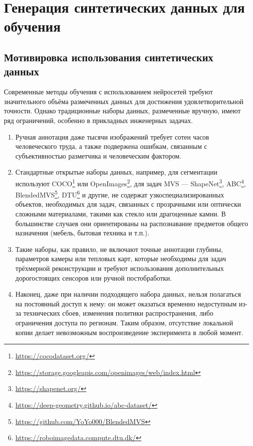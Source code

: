 \chapter{Генерация синтетических данных для обучения}

\section{Мотивировка использования синтетических данных}

Современные методы обучения с использованием нейросетей требуют значительного
объёма размеченных данных для достижения удовлетворительной точности. Однако
традиционные наборы данных, размеченные вручную, имеют ряд ограничений, особенно
в прикладных инженерных задачах.

\begin{enumerate}
  \item Ручная аннотация даже тысячи изображений требует сотен часов
  человеческого труда, а также подвержена ошибкам, связанным с субъективностью
  разметчика и человеческим фактором.
  \item Стандартные открытые наборы данных, например, для сегментации
  используют COCO\footnote{\url{https://cocodataset.org/}} или
  OpenImages\footnote{\url{https://storage.googleapis.com/openimages/web/index.html}},
  для задач MVS — ShapeNet\footnote{\url{https://shapenet.org/}},
  ABC\footnote{\url{https://deep-geometry.github.io/abc-dataset/}},
  BlendedMVS\footnote{\url{https://github.com/YoYo000/BlendedMVS}},
  DTU\footnote{\url{https://roboimagedata.compute.dtu.dk/}} и другие, не
  содержат узкоспециализированных объектов, необходимых для задач, связанных с
  прозрачными или оптически сложными материалами, такими как стекло или
  драгоценные камни. В большинстве случаев они ориентированы на распознавание
  предметов общего назначения (мебель, бытовая техника и т.п.).
  \item Такие наборы, как правило, не включают точные аннотации глубины,
  параметров камеры или тепловых карт, которые необходимы для задач трёхмерной
  реконструкции и требуют использования дополнительных дорогостоящих сенсоров
  или ручной постобработки.
  \item Наконец, даже при наличии подходящего набора данных, нельзя полагаться
  на постоянный доступ к нему: он может оказаться временно недоступным из-за
  технических сбоев, изменения политики распространения, либо ограничения
  доступа по регионам. Таким образом, отсутствие локальной копии делает
  невозможным воспроизведение эксперимента в любой момент.
\end{enumerate}

